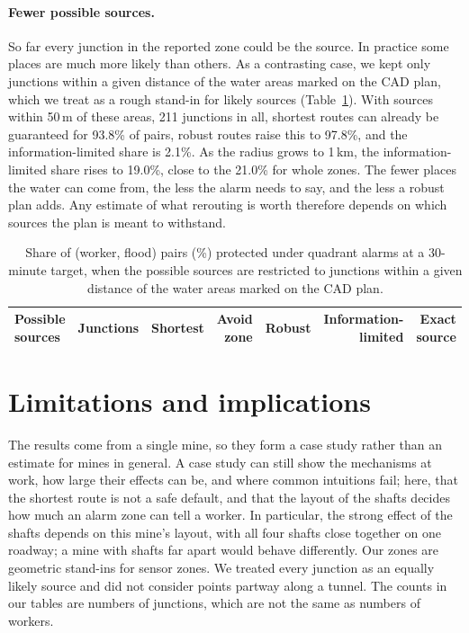 \documentclass[11pt,a4paper]{article}
\begin{document}
\paragraph{Fewer possible sources.}
So far every junction in the reported zone could be the source. In practice some places are much more likely than others. As a contrasting case, we kept only junctions within a given distance of the water areas marked on the CAD plan, which we treat as a rough stand-in for likely sources (Table~\ref{tab:breadth}). With sources within 50\,m of these areas, 211 junctions in all, shortest routes can already be guaranteed for 93.8\% of pairs, robust routes raise this to 97.8\%, and the information-limited share is 2.1\%. As the radius grows to 1\,km, the information-limited share rises to 19.0\%, close to the 21.0\% for whole zones. The fewer places the water can come from, the less the alarm needs to say, and the less a robust plan adds. Any estimate of what rerouting is worth therefore depends on which sources the plan is meant to withstand.

\begin{table}[htbp]
\centering\small
\caption{Share of (worker, flood) pairs (\%) protected under quadrant alarms at a 30-minute target, when the possible sources are restricted to junctions within a given distance of the water areas marked on the CAD plan.}\label{tab:breadth}
\begin{tabular}{@{}lrrrrrr@{}}\toprule
Possible sources & Junctions & Shortest & Avoid zone & Robust & Information-limited & Exact source\\\midrule

\end{tabular}
\end{table}

\section{Limitations and implications}\label{sec:limits}
The results come from a single mine, so they form a case study rather than an estimate for mines in general. A case study can still show the mechanisms at work, how large their effects can be, and where common intuitions fail; here, that the shortest route is not a safe default, and that the layout of the shafts decides how much an alarm zone can tell a worker. In particular, the strong effect of the shafts depends on this mine's layout, with all four shafts close together on one roadway; a mine with shafts far apart would behave differently. Our zones are geometric stand-ins for sensor zones. We treated every junction as an equally likely source and did not consider points partway along a tunnel. The counts in our tables are numbers of junctions, which are not the same as numbers of workers.
\end{document}
